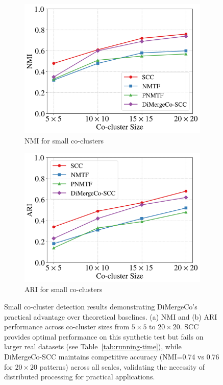 \documentclass[journal]{IEEEtran}
\theoremstyle{definition}
\theoremstyle{remark} %
\begin{document}
\begin{figure}[t]
    \centering
    \begin{subfigure}[b]{0.45\textwidth}
        \centering
        \includegraphics[width=\linewidth]{images/nmi_small.png}
        \caption{NMI for small co-clusters}
        \label{fig:nmi_small}
    \end{subfigure}
    \hfill
    \begin{subfigure}[b]{0.45\textwidth}
        \centering
        \includegraphics[width=\linewidth]{images/ari_small.png}
        \caption{ARI for small co-clusters}
        \label{fig:ari_small}
    \end{subfigure}
    \caption{Small co-cluster detection results demonstrating DiMergeCo's practical advantage over theoretical baselines. (a) NMI and (b) ARI performance across co-cluster sizes from $5 \times 5$ to $20 \times 20$. SCC provides optimal performance on this synthetic test but fails on larger real datasets (see Table~\ref{tab:running-time}), while DiMergeCo-SCC maintains competitive accuracy (NMI=0.74 vs 0.76 for $20 \times 20$ patterns) across all scales, validating the necessity of distributed processing for practical applications.}
    \label{fig:small-co-cluster-detection}
\end{figure}
\end{document}
